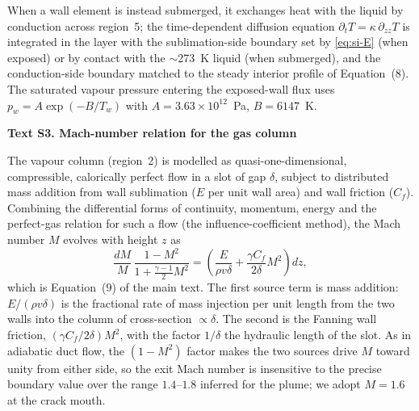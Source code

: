 \documentclass[draft,jgrga]{agutexSI2019}
\begin{document}
\begin{article}
When a wall element is instead submerged, it exchanges heat with the liquid by
conduction across region~5; the time-dependent diffusion equation
$\partial_t T = \kappa\,\partial_{zz}T$ is integrated in the layer with the
sublimation-side boundary set by \eqref{eq:si-E} (when exposed) or by contact
with the $\sim$273~K liquid (when submerged), and the conduction-side boundary
matched to the steady interior profile of Equation~(8). The saturated vapour
pressure entering the exposed-wall flux uses
$p_w = A\exp(-B/T_w)$ with $A=3.63\times10^{12}$~Pa, $B=6147$~K.

\noindent\textbf{Text S3. Mach-number relation for the gas column}

The vapour column (region~2) is modelled as quasi-one-dimensional, compressible,
calorically perfect flow in a slot of gap $\delta$, subject to distributed mass
addition from wall sublimation ($E$ per unit wall area) and wall friction
($C_f$). Combining the differential forms of continuity, momentum, energy and
the perfect-gas relation for such a flow (the influence-coefficient method),
the Mach number $M$ evolves with height $z$ as
\begin{equation}
    \frac{dM}{M}\,\frac{1-M^2}{1+\frac{\gamma-1}{2}M^2}
    = \left(\frac{E}{\rho v \delta} + \frac{\gamma C_f}{2\delta}M^2\right)dz ,
    \label{eq:si-mach}
\end{equation}
which is Equation~(9) of the main text. The first source term is mass addition:
$E/(\rho v\delta)$ is the fractional rate of mass injection per unit length from
the two walls into the column of cross-section $\propto\delta$. The second is
the Fanning wall friction, $(\gamma C_f/2\delta)M^2$, with the factor $1/\delta$
the hydraulic length of the slot. As in adiabatic duct flow, the
$\left(1-M^2\right)$ factor makes the two sources drive $M$ toward unity from
either side, so the exit Mach number is insensitive to the precise boundary
value over the range $1.4$--$1.8$ inferred for the plume; we adopt $M=1.6$ at the
crack mouth.

\end{article}
\end{document}
